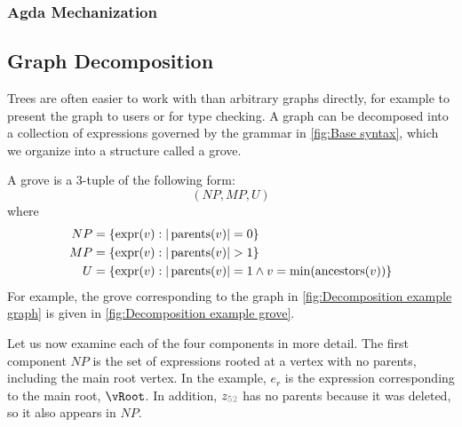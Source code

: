 \subsubsection{Agda Mechanization}%
\label{sub:Agda Mechanization}

\subsection{Graph Decomposition}%
\label{sub:Graph Decomposition}



Trees are often easier to work with than arbitrary graphs directly, for example to present the graph to users or for type checking.
A graph can be decomposed into a collection of expressions governed by the grammar in \autoref{fig:Base syntax}, which we organize into a structure called a grove.

\figureDecompExample


A grove is a 3-tuple of the following form:
\[
  (NP, MP, U)
\]
where
\begin{align*}
  NP &= \{\operatorname{\text{expr}}(v) : |\operatorname{\text{parents}}(v)| = 0\} \\
  MP &= \{\operatorname{\text{expr}}(v) : |\operatorname{\text{parents}}(v)| > 1\} \\
  U  &= \{\operatorname{\text{expr}}(v) : |\operatorname{\text{parents}}(v)| = 1 \wedge v = \min(\operatorname{\text{ancestors}}(v))\}
\end{align*}
For example, the grove corresponding to the graph in \autoref{fig:Decomposition example graph} is
given in \autoref{fig:Decomposition example grove}.

Let us now examine each of the four components in more detail.
%
The first component $NP$ is the set of expressions rooted at a vertex with no parents, including the main root vertex.
In the example, $e_r$ is the expression corresponding to the main root, $\vRoot$.
In addition, $z_{\id{52}}$ has no parents because it was deleted, so it also appears in $NP$.

